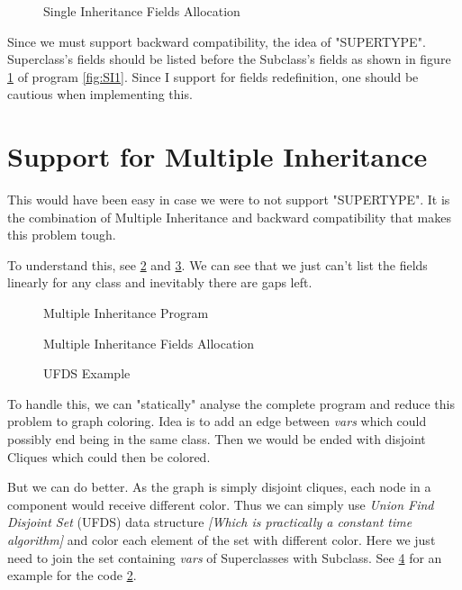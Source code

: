 \begin{figure}
	\centering
	\caption{Single Inheritance Fields Allocation}
	\label{fig:SI2}
\end{figure}

Since we must support backward compatibility, the idea of "SUPERTYPE". Superclass's fields should be listed before the Subclass's fields as shown in figure \ref{fig:SI2} of program \ref{fig:SI1}. Since I support for fields redefinition, one should be cautious when implementing this.

\section{Support for Multiple Inheritance}

This would have been easy in case we were to not support "SUPERTYPE". It is the combination of Multiple Inheritance and backward compatibility that makes this problem tough.

To understand this, see \ref{fig:MI1} and \ref{fig:MI2}. We can see that we just can't list the fields linearly for any class and inevitably there are gaps left.

\begin{figure}
	\centering
	\caption{Multiple Inheritance Program}
	\label{fig:MI1}
\end{figure}

\begin{figure}
	\centering
	\caption{Multiple Inheritance Fields Allocation}
	\label{fig:MI2}
\end{figure}

\begin{figure}
	\centering
	\caption{UFDS Example}
	\label{fig:MI3}
\end{figure}

To handle this, we can "statically" analyse the complete program and reduce this problem to graph coloring. Idea is to add an edge between \textit{vars} which could possibly end being in the same class. Then we would be ended with disjoint Cliques which could then be colored.

But we can do better. As the graph is simply disjoint cliques, each node in a component would receive different color. Thus we can simply use \textit{Union Find Disjoint Set} (UFDS) data structure \textit{[Which is practically a constant time algorithm]} and color each element of the set with different color. Here we just need to join the set containing \textit{vars} of Superclasses with Subclass. See \ref{fig:MI3} for an example for the code \ref{fig:MI1}.

